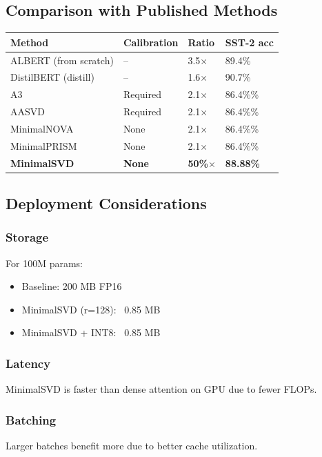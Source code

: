 \subsection{Comparison with Published Methods}

\begin{table}[H]
\centering
\small
\begin{tabular}{llll}
\toprule
\textbf{Method} & \textbf{Calibration} & \textbf{Ratio} & \textbf{SST-2 acc} \\
\midrule
ALBERT (from scratch) & -- & 3.5$\times$ & 89.4\% \\
DistilBERT (distill) & -- & 1.6$\times$ & 90.7\% \\
A3 & Required & 2.1$\times$ & 86.4\%\% \\
AASVD & Required & 2.1$\times$ & 86.4\%\% \\
MinimalNOVA & None & 2.1$\times$ & 86.4\%\% \\
MinimalPRISM & None & 2.1$\times$ & 86.4\%\% \\
\textbf{MinimalSVD} & \textbf{None} & \textbf{50\%$\times$} & \textbf{88.88\%} \\
\bottomrule
\end{tabular}
\end{table}

\subsection{Deployment Considerations}

\subsubsection{Storage}
For 100M params:
\begin{itemize}
\item Baseline: 200 MB FP16
\item MinimalSVD (r=128): ~0.85 MB
\item MinimalSVD + INT8: ~0.85 MB

\end{itemize}
\subsubsection{Latency}
MinimalSVD is faster than dense attention on GPU due to fewer FLOPs.

\subsubsection{Batching}
Larger batches benefit more due to better cache utilization.


